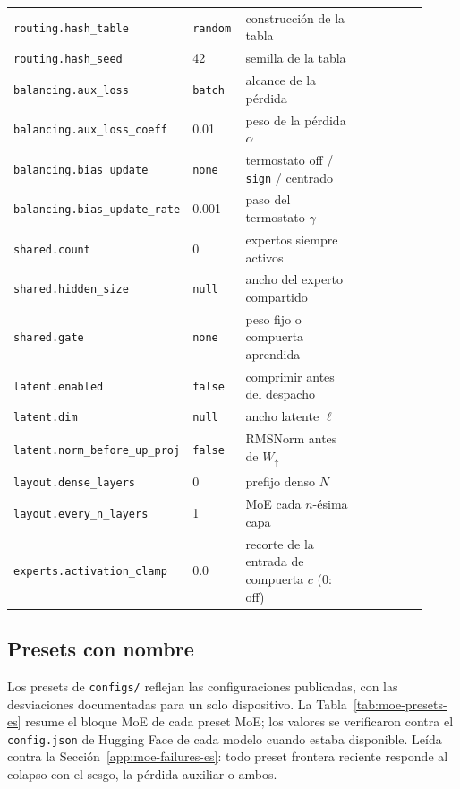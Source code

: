 {\begin{longtable}{@{}L{0.27\linewidth}L{0.13\linewidth}L{0.32\linewidth}L{0.20\linewidth}@{}}
\texttt{routing.hash\_table} & \texttt{random} & construcción de la tabla & \citet{roller2021hash} \\
\texttt{routing.hash\_seed} & 42 & semilla de la tabla & \citet{roller2021hash} \\
\texttt{balancing.aux\_loss} & \texttt{batch} & alcance de la pérdida & \citet{dai2024deepseekmoe,deepseek2024v3} \\
\texttt{balancing.aux\_loss\_coeff} & 0.01 & peso de la pérdida $\alpha$ & \citet{deepseek2024v3} \\
\texttt{balancing.bias\_update} & \texttt{none} & termostato off / \texttt{sign} / centrado & \citet{wang2024auxfree} \\
\texttt{balancing.bias\_update\_rate} & 0.001 & paso del termostato $\gamma$ & \citet{wang2024auxfree} \\
\texttt{shared.count} & 0 & expertos siempre activos & \citet{dai2024deepseekmoe} \\
\texttt{shared.hidden\_size} & \texttt{null} & ancho del experto compartido & \citet{dai2024deepseekmoe} \\
\texttt{shared.gate} & \texttt{none} & peso fijo o compuerta aprendida & \citet{qwen2025qwen3} \\
\texttt{latent.enabled} & \texttt{false} & comprimir antes del despacho & \citet{elango2026latentmoe} \\
\texttt{latent.dim} & \texttt{null} & ancho latente $\ell$ & \citet{elango2026latentmoe} \\
\texttt{latent.norm\_before\_up\_proj} & \texttt{false} & RMSNorm antes de $W_\uparrow$ & \citet{kimiteam2026k3} \\
\texttt{layout.dense\_layers} & 0 & prefijo denso $N$ & \citet{deepseek2024v3} \\
\texttt{layout.every\_n\_layers} & 1 & MoE cada $n$-ésima capa & \citet{meta2025llama4} \\
\texttt{experts.activation\_clamp} & 0.0 & recorte de la entrada de compuerta $c$ (0: off) & \citet{huang2026step35} \\
\bottomrule
\end{longtable}
}

\subsection{Presets con nombre}
\label{app:moe-presets-es}

Los presets de \texttt{configs/} reflejan las configuraciones publicadas, con
las desviaciones documentadas para un solo dispositivo. La
Tabla~\ref{tab:moe-presets-es} resume el bloque MoE de cada preset MoE; los
valores se verificaron contra el \texttt{config.json} de Hugging Face de cada
modelo cuando estaba disponible. Leída contra la
Sección~\ref{app:moe-failures-es}: todo preset frontera reciente responde al
colapso con el sesgo, la pérdida auxiliar o ambos.

